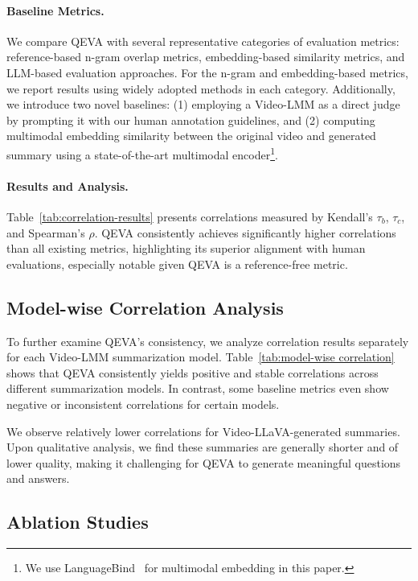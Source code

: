 \paragraph{Baseline Metrics.} 
We compare QEVA with several representative categories of evaluation metrics: reference-based n-gram overlap metrics, embedding-based similarity metrics, and LLM-based evaluation approaches. For the n-gram and embedding-based metrics, we report results using widely adopted methods in each category. Additionally, we introduce two novel baselines: (1) employing a Video-LMM as a direct judge by prompting it with our human annotation guidelines, and (2) computing multimodal embedding similarity between the original video and generated summary using a state-of-the-art multimodal encoder\footnote{We use LanguageBind~\citep{zhu2023languagebind} for multimodal embedding in this paper.}.

\paragraph{Results and Analysis.} Table~\ref{tab:correlation-results} presents correlations measured by Kendall's $\tau_b$, $\tau_c$, and Spearman's $\rho$. QEVA consistently achieves significantly higher correlations than all existing metrics, highlighting its superior alignment with human evaluations, especially notable given QEVA is a reference-free metric.

\subsection{Model-wise Correlation Analysis} \label{sec:modelwise-corr}

To further examine QEVA's consistency, we analyze correlation results separately for each Video-LMM summarization model. Table~\ref{tab:model-wise correlation} shows that QEVA consistently yields positive and stable correlations across different summarization models. In contrast, some baseline metrics even show negative or inconsistent correlations for certain models.

We observe relatively lower correlations for Video-LLaVA-generated summaries. Upon qualitative analysis, we find these summaries are generally shorter and of lower quality, making it challenging for QEVA to generate meaningful questions and answers.

\subsection{Ablation Studies} \label{sec:ablation}

